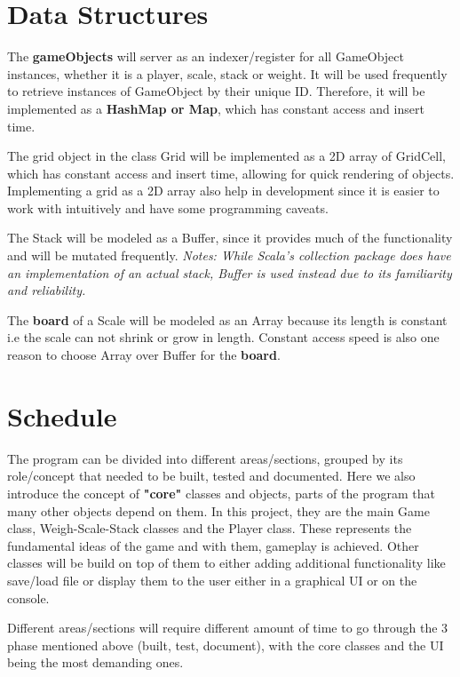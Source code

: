 \documentclass[12pt]{article}
\begin{document}
\section{Data Structures}

The \textbf{gameObjects} will server as an indexer/register for all GameObject
instances, whether it is a player, scale, stack or weight. It will be used
frequently to retrieve instances of GameObject by their unique ID. Therefore, it
will be implemented as a \textbf{HashMap or Map}, which has constant access and
insert time.

The grid object in the class Grid will be implemented as a 2D array of GridCell,
which has constant access and insert time, allowing for quick rendering of
objects. Implementing a grid as a 2D array also help in development since it is
easier to work with intuitively and have some programming caveats.

The Stack will be modeled as a Buffer, since it provides much of the
functionality and will be mutated frequently. \textit{Notes: While Scala's
collection package does have an implementation of an actual stack, Buffer is
used instead due to its familiarity and reliability.} 

The \textbf{board} of a Scale will be modeled as an Array because its length is
constant i.e the scale can not shrink or grow in length. Constant access speed
is also one reason to choose Array over Buffer for the \textbf{board}.


\section{Schedule}

The program can be divided into different areas/sections, grouped by its
role/concept that needed to be built, tested and documented. Here we also
introduce the concept of \textbf{"core"} classes and objects, parts of the
program that many other objects depend on them. In this project, they are the
main Game class, Weigh-Scale-Stack classes and the Player class. These
represents the fundamental ideas of the game and with them, gameplay is
achieved. Other classes will be build on top of them to either adding additional
functionality like save/load file or display them to the user either in a
graphical UI or on the console.

Different areas/sections will require different amount of time to go through the
3 phase mentioned above (built, test, document), with the core classes and the
UI being the most demanding ones. 
\end{document}
